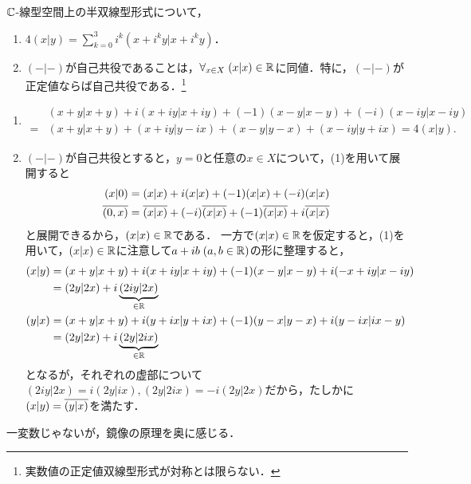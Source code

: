 \documentclass[uplatex,dvipdfmx]{jsreport}
\begin{document}
\begin{lemma}[自己共役性の特徴付け]\label{lemma-characterization-of-self-adjointness}
    $\mathbb{C}$-線型空間上の半双線型形式について，
    \begin{enumerate}
        \item $4(x|y)=\sum^3_{k=0}i^k(x+i^ky|x+i^ky)$．
        \item $(-|-)$が自己共役であることは，$\forall_{x\in X}\;(x|x)\in\mathbb{R}$に同値．特に，$(-|-)$が正定値ならば自己共役である．\footnote{実数値の正定値双線型形式が対称とは限らない．}
    \end{enumerate}
\end{lemma}
\begin{Proof}\mbox{}
    \begin{enumerate}
        \item \begin{align*}
            &(x+y|x+y)+i(x+iy|x+iy)+(-1)(x-y|x-y)+(-i)(x-iy|x-iy)\\
            =&(x+y|x+y)+(x+iy|y-ix)+(x-y|y-x)+(x-iy|y+ix)=4(x|y).
        \end{align*}
        \item $(-|-)$が自己共役とすると，$y=0$と任意の$x\in X$について，(1)を用いて展開すると
        \begin{align*}
            (x|0)&=(x|x)+i(x|x)+(-1)(x|x)+(-i)(x|x)\\
            \overline{(0,x)}&=\overline{(x|x)}+(-i)\overline{(x|x)}+(-1)\overline{(x|x)}+i\overline{(x|x)}
        \end{align*}
        と展開できるから，$(x|x)\in\mathbb{R}$である．
        一方で$(x|x)\in\mathbb{R}$を仮定すると，(1)を用いて，$(x|x)\in\mathbb{R}$に注意して$a+ib\;(a,b\in\mathbb{R})$の形に整理すると，
        \begin{align*}
            (x|y)&=(x+y|x+y)+i(x+iy|x+iy)+(-1)(x-y|x-y)+i(-x+iy|x-iy)\\
            &=(2y|2x)+i\underbrace{(2iy|2x)}_{\in\mathbb{R}}\\
            (y|x)&=(x+y|x+y)+i(y+ix|y+ix)+(-1)(y-x|y-x)+i(y-ix|ix-y)\\
            &=(2y|2x)+i\underbrace{(2y|2ix)}_{\in\mathbb{R}}
        \end{align*}
        となるが，それぞれの虚部について$(2iy|2x)=i(2y|ix),(2y|2ix)=-i(2y|2x)$だから，たしかに$(x|y)=\overline{(y|x)}$を満たす．
    \end{enumerate}
\end{Proof}
\begin{remarks}
    一変数じゃないが，鏡像の原理を奥に感じる．
\end{remarks}
\end{document}
